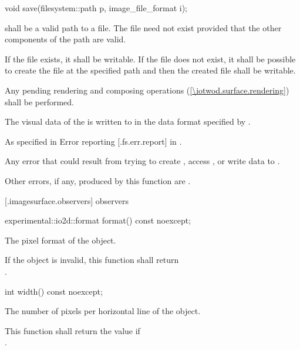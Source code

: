 \begin{itemdecl}
void save(filesystem::path p, image_file_format i);
\end{itemdecl}
\begin{itemdescr}
\pnum
\requires
{} shall be a valid path to a file. The file need not exist provided that the other components of the path are valid.

\pnum
If the file exists, it shall be writable. If the file does not exist, it shall be possible to create the file at the specified path and then the created file shall be writable.

\pnum
\effects
Any pending rendering and composing operations (\ref{\iotwod.surface.rendering}) shall be performed.

\pnum
The visual data of the \underlyingimagesurface is written to  in the data format specified by .

\pnum
\throws
As specified in Error reporting [\iotwod.fs.err.report] in \cppseventeen.

\pnum
\errors
Any error that could result from trying to create , access , or write data to .

\pnum
Other errors, if any, produced by this function are .
\end{itemdescr}

 [\iotwod.imagesurface.observers] { observers}

\begin{itemdecl}
experimental::io2d::format format() const noexcept;
\end{itemdecl}
\begin{itemdescr}
\pnum
\returns
The pixel format of the  object.

\pnum
\remarks
If the  object is invalid, this function shall return \\ .
\end{itemdescr}

\begin{itemdecl}
int width() const noexcept;
\end{itemdecl}
\begin{itemdescr}
\pnum
\returns
The number of pixels per horizontal line of the  object.

\pnum
\remarks
This function shall return the value  if \\
.
\end{itemdescr}

